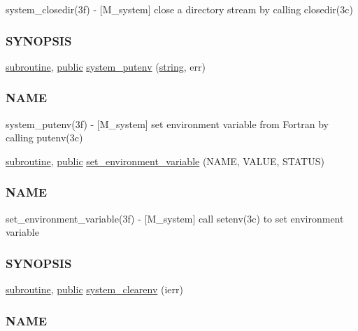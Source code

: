 \begin{DoxyCompactItemize}
\begin{DoxyCompactList}
system\+\_\+closedir(3f) -\/ \mbox{[}M\+\_\+system\mbox{]} close a directory stream by calling closedir(3c) \subsubsection*{S\+Y\+N\+O\+P\+S\+IS}\end{DoxyCompactList}\item 
\hyperlink{M__stopwatch_83_8txt_acfbcff50169d691ff02d4a123ed70482}{subroutine}, \hyperlink{M__stopwatch_83_8txt_a2f74811300c361e53b430611a7d1769f}{public} \hyperlink{namespacem__system_af0c9df8e59cac9cd617cd1e20448ea7d}{system\+\_\+putenv} (\hyperlink{what__overview_81_8txt_a74cb7e955273b9f9157b4f0c18a38849}{string}, err)
\begin{DoxyCompactList}\small\item\em \subsubsection*{N\+A\+ME}

system\+\_\+putenv(3f) -\/ \mbox{[}M\+\_\+system\mbox{]} set environment variable from Fortran by calling putenv(3c) \end{DoxyCompactList}\item 
\hyperlink{M__stopwatch_83_8txt_acfbcff50169d691ff02d4a123ed70482}{subroutine}, \hyperlink{M__stopwatch_83_8txt_a2f74811300c361e53b430611a7d1769f}{public} \hyperlink{namespacem__system_ad813765403a5d9d6fb7a2edcb669fe4b}{set\+\_\+environment\+\_\+variable} (N\+A\+ME, V\+A\+L\+UE, S\+T\+A\+T\+US)
\begin{DoxyCompactList}\small\item\em \subsubsection*{N\+A\+ME}

set\+\_\+environment\+\_\+variable(3f) -\/ \mbox{[}M\+\_\+system\mbox{]} call setenv(3c) to set environment variable \subsubsection*{S\+Y\+N\+O\+P\+S\+IS}\end{DoxyCompactList}\item 
\hyperlink{M__stopwatch_83_8txt_acfbcff50169d691ff02d4a123ed70482}{subroutine}, \hyperlink{M__stopwatch_83_8txt_a2f74811300c361e53b430611a7d1769f}{public} \hyperlink{namespacem__system_a9c34787b170ab8d41000d7c3acb60736}{system\+\_\+clearenv} (ierr)
\begin{DoxyCompactList}\small\item\em \subsubsection*{N\+A\+ME}


\end{DoxyCompactList}
\end{DoxyCompactItemize}
